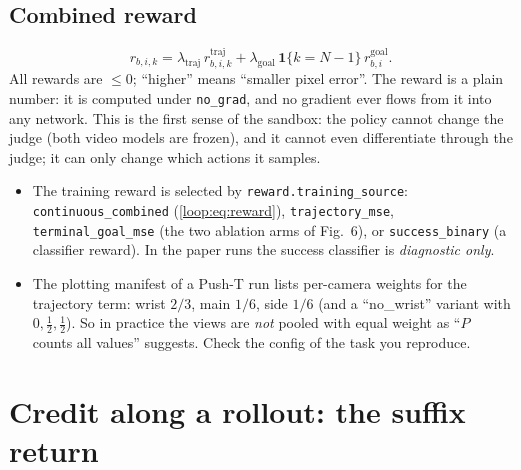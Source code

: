 \subsection{Combined reward }
\begin{equation}
r_{b,i,k}=\lambda_{\mathrm{traj}}\,r^{\mathrm{traj}}_{b,i,k}+\lambda_{\mathrm{goal}}\,\mathbf 1\{k=N-1\}\,r^{\mathrm{goal}}_{b,i}.
\label{loop:eq:reward}
\end{equation}
All rewards are $\le0$; ``higher'' means ``smaller pixel error''. The reward is a plain number: it is computed under \texttt{no\_grad}, and no gradient ever flows from it into any network. This is the first sense of the sandbox: the policy cannot change the judge (both video models are frozen), and it cannot even differentiate through the judge; it can only change which actions it samples.

\begin{codenote}[(rewards)]
\begin{itemize}[leftmargin=*]
\item The training reward is selected by \texttt{reward.training\_source}: \texttt{continuous\_combined} (\eqref{loop:eq:reward}), \texttt{trajectory\_mse}, \texttt{terminal\_goal\_mse} (the two ablation arms of Fig.~6), or \texttt{success\_binary} (a classifier reward). In the paper runs the success classifier is \emph{diagnostic only}.
\item The plotting manifest of a Push-T run lists per-camera weights for the trajectory term: wrist $2/3$, main $1/6$, side $1/6$ (and a ``no\_wrist'' variant with $0,\tfrac12,\tfrac12$). So in practice the views are \emph{not} pooled with equal weight as ``$P$ counts all values'' suggests. Check the config of the task you reproduce.
\end{itemize}
\end{codenote}

\section{Credit along a rollout: the suffix return }

